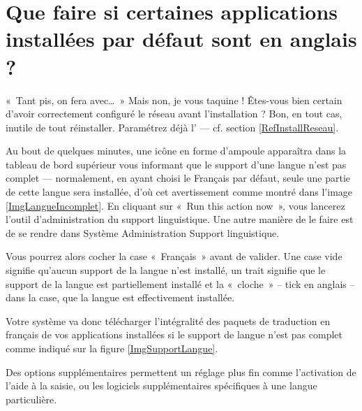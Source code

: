 \section{Que faire si certaines applications installées par défaut sont en anglais ?}
\label{RefSupportLangue}
«~Tant pis, on fera avec\ldots{}~»
Mais non, je vous taquine ! Êtes-vous bien certain d'avoir correctement configuré le réseau avant l'installation ? Bon, en tout cas, inutile de tout réinstaller. Paramétrez déjà l' --- cf. section \ref{RefInstallReseau}.\par
Au bout de quelques minutes, une icône en forme d'ampoule apparaîtra dans la tableau de bord supérieur vous informant que le support d'une langue n'est pas complet --- normalement, en ayant choisi le Français par défaut, seule une partie de cette langue sera installée, d'où cet avertissement comme montré dans l'image \ref{ImgLangueIncomplet}. En cliquant sur «~Run this action now~», vous lancerez l'outil d'administration du support linguistique. Une autre manière de le faire est de se rendre dans Système \FlecheDroite Administration \FlecheDroite Support linguistique.\par
{}
Vous pourrez alors cocher la case «~Français~» avant de valider. Une case vide signifie qu'aucun support de la langue n'est installé, un trait signifie que le support de la langue est partiellement installé et la «~cloche~» -- tick en anglais -- dans la case, que la langue est effectivement installée.\par
Votre système va donc télécharger l'intégralité des paquets de traduction en français de vos applications installées si le support de langue n'est pas complet comme indiqué sur la figure \ref{ImgSupportLangue}.\par
Des options supplémentaires permettent un réglage plus fin comme l'activation de l'aide à la saisie, ou les logiciels supplémentaires spécifiques à une langue particulière.\par
{}
